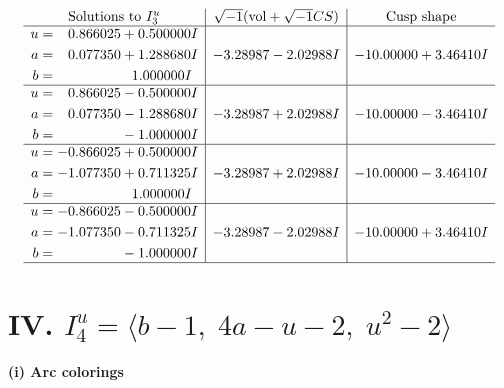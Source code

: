 \documentclass[1p]{elsarticle_modified}
\theoremstyle{definition}
\newcommand{\I}{\sqrt{-1}}
\begin{document}
$$\begin{array}{c|c|c}  
\text{Solutions to }I^u_{3}& \I (\text{vol} + \sqrt{-1}CS) & \text{Cusp shape}\\
 \hline 
\begin{aligned}
u &= \phantom{-}0.866025 + 0.500000 I \\
a &= \phantom{-}0.077350 + 1.288680 I \\
b &= \phantom{-0.000000 -}1.000000 I\end{aligned}
 & -3.28987 - 2.02988 I & -10.00000 + 3.46410 I \\ \hline\begin{aligned}
u &= \phantom{-}0.866025 - 0.500000 I \\
a &= \phantom{-}0.077350 - 1.288680 I \\
b &= \phantom{-0.000000 } -1.000000 I\end{aligned}
 & -3.28987 + 2.02988 I & -10.00000 - 3.46410 I \\ \hline\begin{aligned}
u &= -0.866025 + 0.500000 I \\
a &= -1.077350 + 0.711325 I \\
b &= \phantom{-0.000000 -}1.000000 I\end{aligned}
 & -3.28987 + 2.02988 I & -10.00000 - 3.46410 I \\ \hline\begin{aligned}
u &= -0.866025 - 0.500000 I \\
a &= -1.077350 - 0.711325 I \\
b &= \phantom{-0.000000 } -1.000000 I\end{aligned}
 & -3.28987 - 2.02988 I & -10.00000 + 3.46410 I\\
 \hline 
 \end{array}$$\newpage\newpage\renewcommand{\arraystretch}{1}
\centering \section*{IV. $I^u_{4}= \langle b-1,\;4 a- u-2,\;u^2-2 \rangle$}
\flushleft \textbf{(i) Arc colorings}\\
\end{document}
